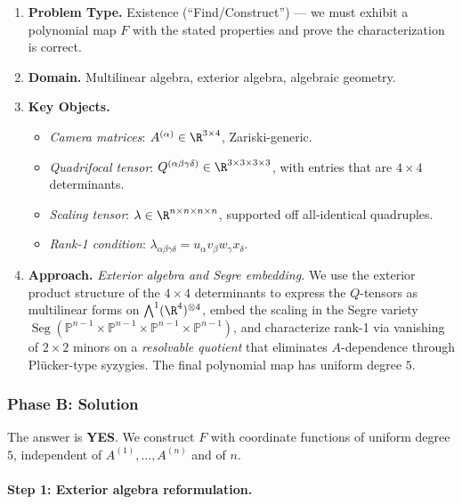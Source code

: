 \begin{enumerate}
\item \textbf{Problem Type.} Existence (``Find/Construct'') --- we must exhibit a polynomial map $F$
      with the stated properties and prove the characterization is correct.
\item \textbf{Domain.} Multilinear algebra, exterior algebra, algebraic geometry.
\item \textbf{Key Objects.}
  \begin{itemize}
    \item \emph{Camera matrices}: $A^{(\alpha)} \in \R^{3 \times 4}$, Zariski-generic.
    \item \emph{Quadrifocal tensor}: $Q^{(\alpha\beta\gamma\delta)} \in \R^{3\times 3\times 3\times 3}$,
          with entries that are $4\times 4$ determinants.
    \item \emph{Scaling tensor}: $\lambda \in \R^{n\times n\times n\times n}$, supported off
          all-identical quadruples.
    \item \emph{Rank-1 condition}: $\lambda_{\alpha\beta\gamma\delta} = u_\alpha v_\beta w_\gamma x_\delta$.
  \end{itemize}
\item \textbf{Approach.} \emph{Exterior algebra and Segre embedding.}
      We use the exterior product structure of the $4\times 4$ determinants to express
      the $Q$-tensors as multilinear forms on $\bigwedge^1(\R^4)^{\otimes 4}$,
      embed the scaling in the Segre variety
      $\operatorname{Seg}(\mathbb{P}^{n-1}\times\mathbb{P}^{n-1}\times\mathbb{P}^{n-1}\times\mathbb{P}^{n-1})$,
      and characterize rank-1 via vanishing of $2\times 2$ minors on a
      \emph{resolvable quotient} that eliminates $A$-dependence through
      Pl\"ucker-type syzygies. The final polynomial map has uniform degree $5$.
\end{enumerate}

\subsubsection*{Phase B: Solution}

The answer is \textbf{YES}. We construct $F$ with coordinate functions of
uniform degree $5$, independent of $A^{(1)},\ldots, A^{(n)}$ and of $n$.

\bigskip

\paragraph{Step 1: Exterior algebra reformulation.}

